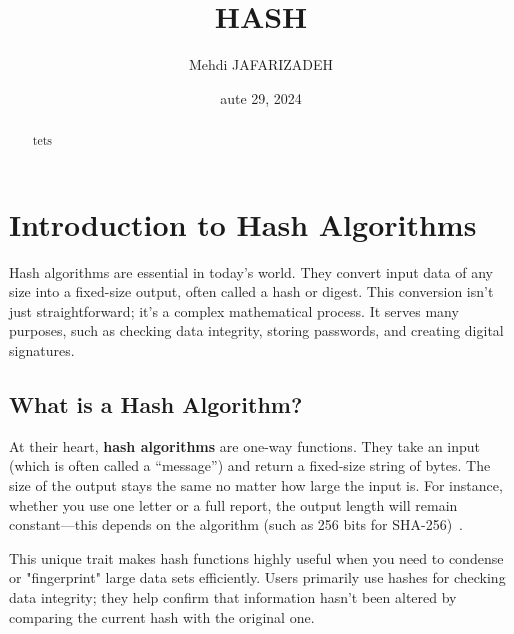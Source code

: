 \documentclass[11pt,a4paper]{article}
\title{HASH}
\author{Mehdi JAFARIZADEH}
\date{aute 29, 2024}
\begin{document}
\maketitle

\begin{abstract}
    tets
\end{abstract}

\newpage

\section*{Introduction to Hash Algorithms}
Hash algorithms are essential in today’s world. They convert input data of any size into a fixed-size output, often called a hash or digest. This conversion isn’t just straightforward; it’s a complex mathematical process. It serves many purposes, such as checking data integrity, storing passwords, and creating digital signatures.


    \subsection*{What is a Hash Algorithm?}
    At their heart, \textbf{hash algorithms} are one-way functions. They take an input (which is often called a “message”) and return a fixed-size string of bytes. The size of the output stays the same no matter how large the input is. For instance, whether you use one letter or a full report, the output length will remain constant—this depends on the algorithm (such as 256 bits for SHA-256)~\cite{Introduction}.

    This unique trait makes hash functions highly useful when you need to condense or "fingerprint" large data sets efficiently. Users primarily use hashes for checking data integrity; they help confirm that information hasn’t been altered by comparing the current hash with the original one.
\end{document}
